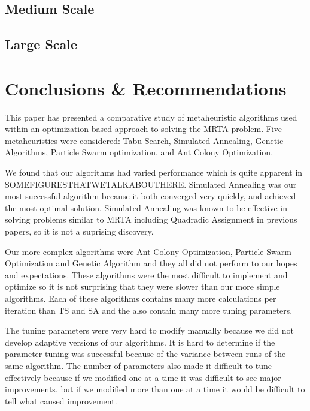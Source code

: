 \documentclass[a4paper]{article}
\begin{document}
\subsection{Medium Scale}

\subsection{Large Scale}

\section{Conclusions \& Recommendations}


This paper has presented a comparative study of metaheuristic algorithms used within an optimization based approach to solving the MRTA problem. Five metaheuristics were considered: Tabu Search, Simulated Annealing, Genetic Algorithms, Particle Swarm optimization, and Ant Colony Optimization.

We found that our algorithms had varied performance which is quite apparent in SOMEFIGURESTHATWETALKABOUTHERE. Simulated Annealing was our most successful algorithm because it both converged very quickly, and achieved the most optimal solution. Simulated Annealing was known to be effective in solving problems similar to MRTA including Quadradic Assignment in previous papers, so it is not a suprising discovery\cite{Badreldin}.

Our more complex algorithms were Ant Colony Optimization, Particle Swarm Optimization and Genetic Algorithm and they all did not perform to our hopes and expectations. These algorithms were the most difficult to implement and optimize so it is not surprising that they were slower than our more simple algorithms. Each of these algorithms contains many more calculations per iteration than TS and SA and the also contain many more tuning parameters.

The tuning parameters were very hard to modify manually because we did not develop adaptive versions of our algorithms. It is hard to determine if the parameter tuning was successful because of the variance between runs of the same algorithm. The number of parameters also made it difficult to tune effectively because if we modified one at a time it was difficult to see major improvements, but if we modified more than one at a time it would be difficult to tell what caused improvement.
\end{document}
